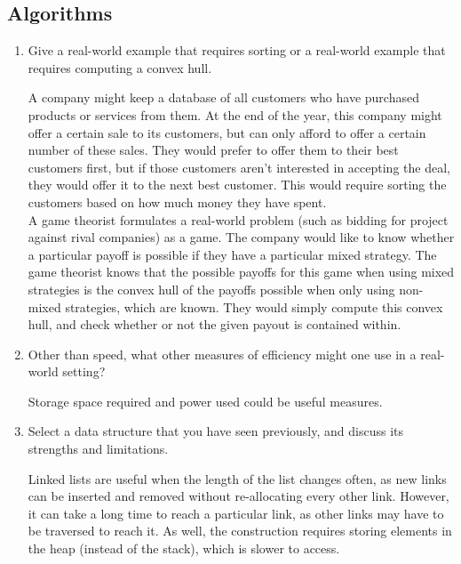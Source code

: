 \documentclass[Chapter01]{subfiles}
\begin{document}
	\subsection{Algorithms}

	\begin{enumerate}[leftmargin=\labelsep]
		\item Give a real-world example that requires sorting or a real-world example that requires computing a convex hull.
		\begin{answer}
			A company might keep a database of all customers who have purchased products or services from them. At the end of the year, this company might offer a certain sale to its customers, but can only afford to offer a certain number of these sales. They would prefer to offer them to their best customers first, but if those customers aren't interested in accepting the deal, they would offer it to the next best customer. This would require sorting the customers based on how much money they have spent.\\

			A game theorist formulates a real-world problem (such as bidding for project against rival companies) as a game. The company would like to know whether a particular payoff is possible if they have a particular mixed strategy. The game theorist knows that the possible payoffs for this game when using mixed strategies is the convex hull of the payoffs possible when only using non-mixed strategies, which are known. They would simply compute this convex hull, and check whether or not the given payout is contained within.
		\end{answer}

		\item Other than speed, what other measures of efficiency might one use in a real-world setting?
		\begin{answer}
			Storage space required and power used could be useful measures.
		\end{answer}

		\item Select a data structure that you have seen previously, and discuss its strengths and limitations.
		\begin{answer}
			Linked lists are useful when the length of the list changes often, as new links can be inserted and removed without re-allocating every other link. However, it can take a long time to reach a particular link, as other links may have to be traversed to reach it. As well, the construction requires storing elements in the heap (instead of the stack), which is slower to access.
		\end{answer}


\end{enumerate}
\end{document}
